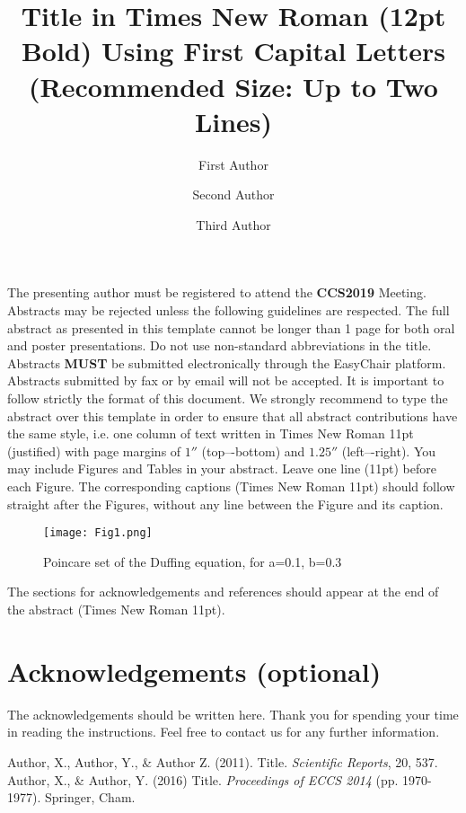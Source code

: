 \documentclass[11pt, a4paper]{article}
\begin{document}
\title{\vspace{-3.0cm}\large\textbf{Title in Times New Roman (12pt Bold) Using First Capital Letters \\(Recommended Size: Up to Two Lines)}}

\author[1]{\footnotesize First Author}
\author[2]{\footnotesize Second Author}
\author[1,2]{\footnotesize Third Author}
\date{\vspace{-5ex}}

\maketitle
\thispagestyle{empty}

\noindent
The presenting author must be registered to attend the \textbf{CCS2019} Meeting. 
Abstracts may be rejected unless the following guidelines are respected. 
The full abstract as presented in this template cannot be longer than 1 page for both oral and poster presentations. 
Do not use non-standard abbreviations in the title. 
Abstracts \textbf{MUST} be submitted electronically through the EasyChair platform. 
Abstracts submitted by fax or by email will not be accepted. 
It is important to follow strictly the format of this document. 
We strongly recommend to type the abstract over this template in order to ensure that all abstract contributions have the same style, i.e. one column of text written in Times New Roman 11pt (justified) with page margins of $1''$ (top–-bottom) and $1.25''$ (left–-right). 
You may include Figures and Tables in your abstract. 
Leave one line (11pt) before each Figure. 
The corresponding captions (Times New Roman 11pt) should follow straight after the Figures, without any line between the Figure and its caption.

\begin{figure}[!htp]
  \centering
  \texttt{[image: Fig1.png]}
  \caption{Poincare set of the Duffing equation, for a=0.1, b=0.3}\label{fig:1}
\end{figure}

\noindent
The sections for acknowledgements and references should appear at the end of the abstract (Times New Roman 11pt).

\section*{Acknowledgements (optional)}
The acknowledgements should be written here. Thank you for spending your time in reading the instructions. Feel free to contact us for any further information.

\begin{thebibliography}{9}
Author, X., Author, Y., \& Author Z. (2011). Title. \emph{Scientific Reports}, 20, 537.
Author, X., \& Author, Y. (2016) Title. \emph{Proceedings of ECCS 2014} (pp. 1970-1977). Springer, Cham.
\end{thebibliography}
\end{document}
